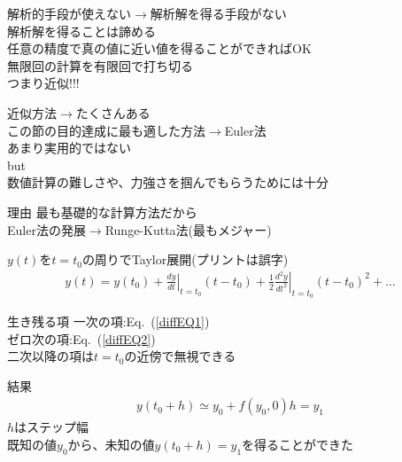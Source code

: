 \documentclass[unicode, 12pt, aspectratio=169]{beamer}
\newcommand{\eref}[1]{Eq.~(\ref{#1})}
\begin{document}
\begin{frame}
    解析的手段が使えない$\rightarrow$解析解を得る手段がない\\
    解析解を得ることは諦める\\
    任意の精度で真の値に近い値を得ることができればOK\\
    無限回の計算を有限回で打ち切る\\
    \alert{つまり近似!!!}
\end{frame}

\begin{frame}
    近似方法$\rightarrow$たくさんある\\
    この節の目的達成に最も適した方法$\rightarrow$Euler法\\
    あまり実用的ではない\\
    \alert{but}\\
    数値計算の難しさや、力強さを掴んでもらうためには十分
    \begin{alertblock}{理由}
    最も基礎的な計算方法だから\\
      Euler法の発展$\rightarrow$Runge-Kutta法(最もメジャー)
    \end{alertblock}
\end{frame}

\begin{frame}
  $y(t)$を\alert{$t=t_0$}の周りでTaylor展開(プリントは誤字)
  \begin{align}
      y(t) = y(t_0) + \left.\frac{dy}{dt}\right|_{t=t_0}\!(t-t_0) 
      + \frac{1}{2}\left.\frac{d^2y}{dt^2}\right|_{t=t_0}\!(t-t_0)^2 + \dots\label{Ytaylor1}
    \end{align}
\end{frame}

\begin{frame}
  \begin{block}{生き残る項}
    一次の項:\eref{diffEQ1}\\
    ゼロ次の項:\eref{diffEQ2}\\
    二次以降の項は$t=t_0$の近傍で無視できる\\
  \end{block}

  \begin{block}{結果}
    \begin{align}
      y(t_0 + h) \simeq y_0 + f(y_0,0)h = y_1 \label{EulerMethod1} 
    \end{align}
    $h$はステップ幅\\
    既知の値$y_0$から、未知の値$y(t_0 + h)=y_1$を得ることができた
  \end{block}
\end{frame}
\end{document}

